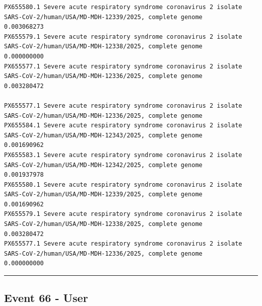 \documentclass[
  11pt,
]{article}
\newenvironment{rpoutput}{\vspace{0.5em}\begin{snugshade}}{\end{snugshade}}
\begin{document}
\begin{rpoutput}
\begin{verbatim}
PX655580.1 Severe acute respiratory syndrome coronavirus 2 isolate SARS-CoV-2/human/USA/MD-MDH-12339/2025, complete genome                                                                                                                0.003068273
PX655579.1 Severe acute respiratory syndrome coronavirus 2 isolate SARS-CoV-2/human/USA/MD-MDH-12338/2025, complete genome                                                                                                                0.000000000
PX655577.1 Severe acute respiratory syndrome coronavirus 2 isolate SARS-CoV-2/human/USA/MD-MDH-12336/2025, complete genome                                                                                                                0.003280472
                                                                                                                           PX655577.1 Severe acute respiratory syndrome coronavirus 2 isolate SARS-CoV-2/human/USA/MD-MDH-12336/2025, complete genome
PX655584.1 Severe acute respiratory syndrome coronavirus 2 isolate SARS-CoV-2/human/USA/MD-MDH-12343/2025, complete genome                                                                                                                0.001690962
PX655583.1 Severe acute respiratory syndrome coronavirus 2 isolate SARS-CoV-2/human/USA/MD-MDH-12342/2025, complete genome                                                                                                                0.001937978
PX655580.1 Severe acute respiratory syndrome coronavirus 2 isolate SARS-CoV-2/human/USA/MD-MDH-12339/2025, complete genome                                                                                                                0.001690962
PX655579.1 Severe acute respiratory syndrome coronavirus 2 isolate SARS-CoV-2/human/USA/MD-MDH-12338/2025, complete genome                                                                                                                0.003280472
PX655577.1 Severe acute respiratory syndrome coronavirus 2 isolate SARS-CoV-2/human/USA/MD-MDH-12336/2025, complete genome                                                                                                                0.000000000
\end{verbatim}

\end{rpoutput}

\begin{center}\rule{0.5\linewidth}{0.5pt}\end{center}

\subsection{Event 66 - User}\label{event-66---user}
\end{document}
